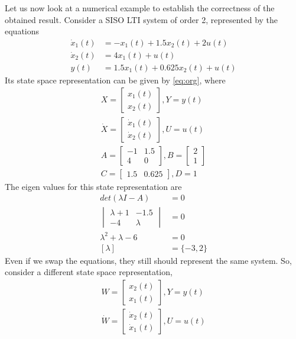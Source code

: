 \documentclass[journal,12pt,twocolumn]{IEEEtran}
\begin{document}
Let us now look at a numerical example to establish the correctness of the obtained result. Consider a SISO LTI system of order 2, represented by the equations
\begin{align}
    \dot x_1(t)&=-x_1(t)+1.5x_2(t)+2u(t)\\
    \dot x_2(t)&=4x_1(t)+u(t)\\
    y(t)&=1.5x_1(t)+0.625x_2(t)+u(t)
\end{align}
Its state space representation can be given by \eqref{eq:org}, where
\begin{align}
    X=\begin{bmatrix}
    x_1(t)\\x_2(t)
    \end{bmatrix},Y=y(t)\\
    \dot X=\begin{bmatrix}
    \dot x_1(t)\\\dot x_2(t)
    \end{bmatrix},U=u(t)\\
    A=\begin{bmatrix}
    -1 & 1.5\\
    4 & 0
    \end{bmatrix},B=\begin{bmatrix}
    2\\
    1
    \end{bmatrix}\\
    C=\begin{bmatrix}
    1.5 & 0.625
    \end{bmatrix},D=1
\end{align}
The eigen values for this state representation are
\begin{align}
    det(\lambda I-A)&=0\\
    \begin{vmatrix}
    \lambda+1 & -1.5\\
    -4 & \lambda
    \end{vmatrix}&=0\\
    \lambda^2+\lambda-6&=0\\
    [\lambda]&=\{-3,2\}
\end{align}
Even if we swap the equations, they still should represent the same system. So, consider a different state space representation, 
\begin{align}
    W=\begin{bmatrix}
    x_2(t)\\x_1(t)
    \end{bmatrix},Y=y(t)\\
    \dot W=\begin{bmatrix}
    \dot x_2(t)\\\dot x_1(t)
    \end{bmatrix},U=u(t)
\end{align}
\end{document}
